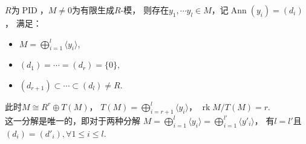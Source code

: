     \begin{theorem}\label{PID上模基本定理}
        $R$为$\operatorname{PID}$，$M\neq 0$为有限生成$R$-模，
        则存在$y_1,\cdots y_l\in M$，记$\operatorname{Ann}(y_i)=(d_i)$，
        满足：
        \begin{itemize}

        \item[(1)]$M=\bigoplus\limits_{i=1}^l\langle y_i\rangle$,\\
        \item[(2)]$(d_1)=\cdots=(d_r)=\{0\},$\\
        \item[(3)]$(d_{r+1})\subset \cdots \subset(d_l)\neq R$.\\
        \end{itemize}
        此时$M\cong R^r\oplus T(M)$，
        $T(M)=\bigoplus\limits_{i=r+1}^l\langle y_i\rangle$，
        $\operatorname{rk}M/T(M)=r.$\\
        这一分解是唯一的，即对于两种分解
        $M=\bigoplus\limits_{i=1}^l\langle y_i\rangle
        =\bigoplus\limits_{i=1}^{l'}\langle y'_i\rangle$，
        有$l=l'$且$(d_i)=(d'_i),\forall 1\leq i \leq l$. 
    \end{theorem}
